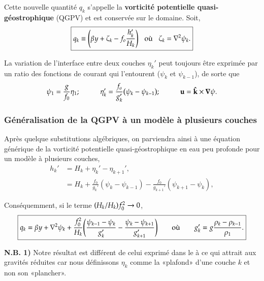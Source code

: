 \documentclass[10pt]{article}
\numberwithin{equation}{section}
\newcommand{\kvf}{\vb{\hat{k}}}
\begin{document}
Cette nouvelle quantité \(q_k\) s'appelle la \textbf{vorticité potentielle quasi-géostrophique} (QGPV) et est conservée sur le domaine.
Soit,
\begin{equation}
\label{eq:org000fe32}
\boxed{q_k \equiv \qty( \beta  y + \zeta_k - f_o \frac{h_k'}{H_k})
\hspace{0.3cm} \text{où} \hspace{0.3cm}
\zeta_k = \laplacian \psi_k.}
\end{equation}

La variation de l'interface entre deux couches \(\eta_k'\) peut toujours être exprimée par un ratio des fonctions de courant qui l'entourent (\(\psi_{k}\) et \(\psi_{k-1}\)), de sorte que 
\begin{equation}
\psi_1 = \frac{g}{f_0} \eta_1; 
\hspace{1cm} \eta_k' = \frac{f_o}{g_k'} \qty(\psi_k - \psi_{k-1});
\hspace{1cm} \vb{u} = \kvf \times \gradient\psi.
\end{equation}

\subsubsection{Généralisation de la QGPV à un modèle à plusieurs couches}
\label{sec:org629b31b}

Après quelque substitutions algébriques, on parviendra ainsi à une équation générique de la vorticité potentielle quasi-géostrophique en eau peu profonde pour un modèle à plusieurs couches,
\begin{align}
h_k' &= H_k + \eta_k' - \eta_{k+1}',\\
&= H_k + \frac{f_0}{g_k'} (\psi_k - \psi_{k-1}) - \frac{f_0}{g_{k+1}'} (\psi_{k+1} - \psi_k),
\end{align}

Conséquemment, si le terme \(\qty(H_k/H_k)f_0^2 \rightarrow 0\), 
\begin{equation}
\boxed{q_k  = \beta y + \laplacian \psi_k + \frac{f_0^2}{H_k} \qty(\frac{\psi_{k-1}-\psi_k}{g_k'} -  \frac{\psi_k - \psi_{k+1}}{g_{k+1}'})
\hspace{0.7cm} \text{où} \hspace{0.7cm}
g_k' = g \frac{\rho_k - \rho_{k-1}}{\rho_1}.}
\end{equation}

\textbf{N.B. 1)} Notre résultat est différent de celui exprimé dans le \citep[, p.185]{vallis_2006} à ce qui attrait aux gravités réduites car nous définissons \(\eta_k\) comme la «plafond» d'une couche \(k\) et non son «plancher».\\[0pt]
\end{document}
